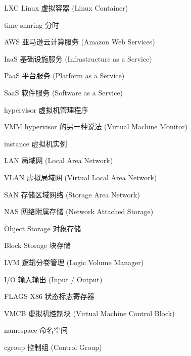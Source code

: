 \begin{denotation}[3cm]
\item[LXC] Linux 虚拟容器 (Linux Container)
\item[time-sharing] 分时
\item[AWS] 亚马逊云计算服务 (Amazon Web Services)
\item[IaaS] 基础设施服务 (Infrastructure as a Service)
\item[PaaS] 平台服务 (Platform as a Service)
\item[SaaS] 软件服务 (Software as a Service)
\item[hypervisor] 虚拟机管理程序
\item[VMM] hypervisor 的另一种说法 (Virtual Machine Monitor)
\item[instance] 虚拟机实例
\item[LAN] 局域网 (Local Area Network)
\item[VLAN] 虚拟局域网 (Virtual Local Area Network)
\item[SAN] 存储区域网络 (Storage Area Network)
\item[NAS] 网络附属存储 (Network Attached Storage)
\item[Object Storage] 对象存储
\item[Block Storage] 块存储
\item[LVM] 逻辑分卷管理 (Logic Volume Manager)
\item[I/O] 输入输出 (Input / Output)
\item[FLAGS] X86 状态标志寄存器
\item[VMCB] 虚拟机控制块 (Virtual Machine Control Block)
\item[namespace] 命名空间
\item[cgroup] 控制组 (Control Group)
\end{denotation}
